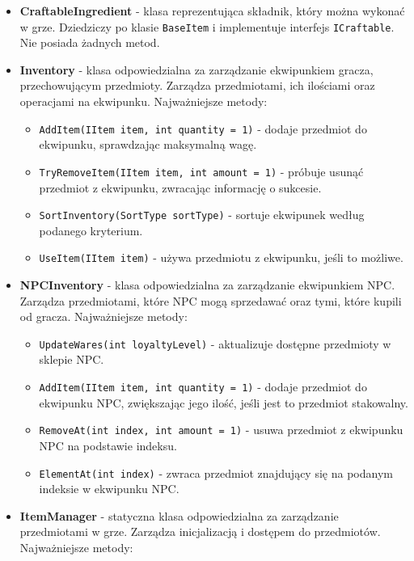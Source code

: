 \begin{itemize}
\begin{itemize}
            \end{itemize}
        \item \textbf{CraftableIngredient} - klasa reprezentująca składnik, który można wykonać w grze. 
        Dziedziczy po klasie \texttt{BaseItem} i implementuje interfejs \texttt{ICraftable}. Nie posiada żadnych metod.
        \item \textbf{Inventory} - klasa odpowiedzialna za zarządzanie ekwipunkiem gracza, przechowującym przedmioty. 
        Zarządza przedmiotami, ich ilościami oraz operacjami na ekwipunku. Najważniejsze metody:
            \begin{itemize}
                \item \texttt{AddItem(IItem item, int quantity = 1)} - dodaje przedmiot do ekwipunku, sprawdzając maksymalną wagę.
                \item \texttt{TryRemoveItem(IItem item, int amount = 1)} - próbuje usunąć przedmiot z ekwipunku, zwracając informację o sukcesie.
                \item \texttt{SortInventory(SortType sortType)} - sortuje ekwipunek według podanego kryterium.
                \item \texttt{UseItem(IItem item)} - używa przedmiotu z ekwipunku, jeśli to możliwe.
            \end{itemize}
        \item \textbf{NPCInventory} - klasa odpowiedzialna za zarządzanie ekwipunkiem NPC. 
        Zarządza przedmiotami, które NPC mogą sprzedawać oraz tymi, które kupili od gracza. Najważniejsze metody:
            \begin{itemize}
                \item \texttt{UpdateWares(int loyaltyLevel)} - aktualizuje dostępne przedmioty w sklepie NPC.
                \item \texttt{AddItem(IItem item, int quantity = 1)} - dodaje przedmiot do ekwipunku NPC, zwiększając jego ilość, jeśli jest to przedmiot stakowalny.
                \item \texttt{RemoveAt(int index, int amount = 1)} - usuwa przedmiot z ekwipunku NPC na podstawie indeksu.
                \item \texttt{ElementAt(int index)} - zwraca przedmiot znajdujący się na podanym indeksie w ekwipunku NPC.
            \end{itemize}
        \item \textbf{ItemManager} - statyczna klasa odpowiedzialna za zarządzanie przedmiotami w grze. 
        Zarządza inicjalizacją i dostępem do przedmiotów. Najważniejsze metody:

\end{itemize}
